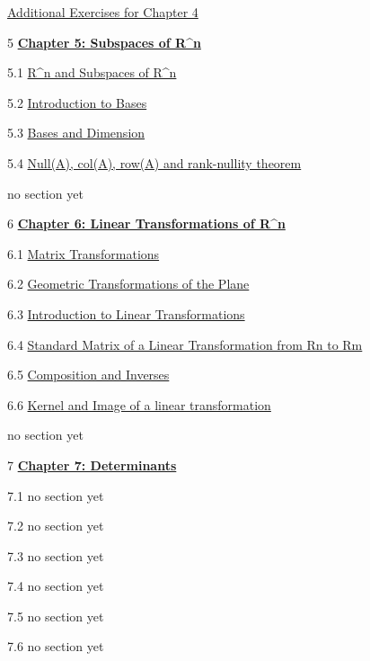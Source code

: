 \documentclass{ximera}
\begin{document}
	\href{https://ximera.osu.edu/oerlinalg/LinearAlgebra/SUPX-0040/main}{Additional Exercises for Chapter 4}
	
5	\href{https://ximera.osu.edu/oerlinalg/LinearAlgebra/XLAChapter_subspacesRn/main}{\textbf{Chapter 5: Subspaces of R^n}}
	
5.1	\href{https://ximera.osu.edu/oerlinalg/LinearAlgebra/VSP-0020/main}{R^n and Subspaces of R^n}
	
5.2	\href{https://ximera.osu.edu/oerlinalg/LinearAlgebra/VSP-0030/main}{Introduction to Bases}
	
5.3	\href{https://ximera.osu.edu/oerlinalg/LinearAlgebra/VSP-0035/main}{Bases and Dimension}
	
5.4	\href{https://ximera.osu.edu/oerlinalg/LinearAlgebra/VSP-0040/main}{Null(A), col(A), row(A) and rank-nullity theorem}
	
	no section yet
	
6	\href{https://ximera.osu.edu/oerlinalg/LinearAlgebra/XLAChapter_linTrans/main}{\textbf{Chapter 6: Linear Transformations of R^n}}
	
6.1	\href{https://ximera.osu.edu/oerlinalg/LinearAlgebra/LTR-0005/main}{Matrix Transformations}
	
6.2	\href{https://ximera.osu.edu/oerlinalg/LinearAlgebra/LTR-0070/main}{Geometric Transformations of the Plane}
	
6.3	\href{https://ximera.osu.edu/oerlinalg/LinearAlgebra/LTR-0010/main}{Introduction to Linear Transformations}
	
6.4	\href{https://ximera.osu.edu/oerlinalg/LinearAlgebra/LTR-0020/main}{Standard Matrix of a Linear Transformation from Rn to Rm}
	
6.5	\href{https://ximera.osu.edu/oerlinalg/LinearAlgebra/LTR-0030/main}{Composition and Inverses}
	
6.6	\href{https://ximera.osu.edu/oerlinalg/LinearAlgebra/LTR-0050/main}{Kernel and Image of a linear transformation}
	
	no section yet
	
7	\href{https://ximera.osu.edu/oerlinalg/LinearAlgebra/XLAChapter_det/main}{\textbf{Chapter 7: Determinants}}
	
7.1	no section yet
	
7.2	no section yet
	
7.3	no section yet
	
7.4	no section yet
	
7.5	no section yet
	
7.6	no section yet
	
\end{document}
